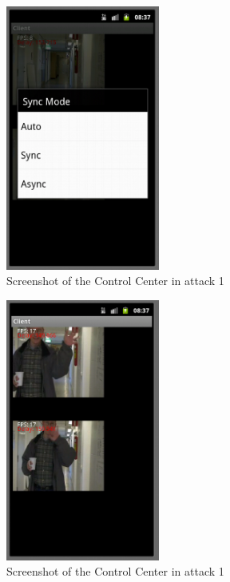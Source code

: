 \documentclass[8pt,titlepage]{article}
\begin{document}
\begin{figure}[hbp]
\includegraphics[width=0.45\textwidth]{../screenshots/androidSyncMode.png}
\caption{Screenshot of the Control Center in attack 1}
\end{figure}

\begin{figure}[hbp]
\includegraphics[width=0.45\textwidth]{../screenshots/androidSyncing.png}
\caption{Screenshot of the Control Center in attack 1}
\end{figure}
\end{document}

